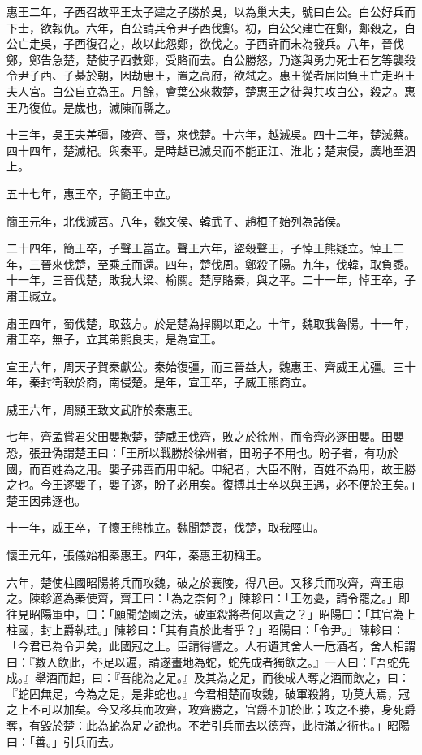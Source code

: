 \begin{pinyinscope}
惠王二年，子西召故平王太子建之子勝於吳，以為巢大夫，號曰白公。白公好兵而下士，欲報仇。六年，白公請兵令尹子西伐鄭。初，白公父建亡在鄭，鄭殺之，白公亡走吳，子西復召之，故以此怨鄭，欲伐之。子西許而未為發兵。八年，晉伐鄭，鄭告急楚，楚使子西救鄭，受賂而去。白公勝怒，乃遂與勇力死士石乞等襲殺令尹子西、子綦於朝，因劫惠王，置之高府，欲弒之。惠王從者屈固負王亡走昭王夫人宮。白公自立為王。月餘，會葉公來救楚，楚惠王之徒與共攻白公，殺之。惠王乃復位。是歲也，滅陳而縣之。

十三年，吳王夫差彊，陵齊、晉，來伐楚。十六年，越滅吳。四十二年，楚滅蔡。四十四年，楚滅杞。與秦平。是時越已滅吳而不能正江、淮北；楚東侵，廣地至泗上。

五十七年，惠王卒，子簡王中立。

簡王元年，北伐滅莒。八年，魏文侯、韓武子、趙桓子始列為諸侯。

二十四年，簡王卒，子聲王當立。聲王六年，盜殺聲王，子悼王熊疑立。悼王二年，三晉來伐楚，至乘丘而還。四年，楚伐周。鄭殺子陽。九年，伐韓，取負黍。十一年，三晉伐楚，敗我大梁、榆關。楚厚賂秦，與之平。二十一年，悼王卒，子肅王臧立。

肅王四年，蜀伐楚，取茲方。於是楚為捍關以距之。十年，魏取我魯陽。十一年，肅王卒，無子，立其弟熊良夫，是為宣王。

宣王六年，周天子賀秦獻公。秦始復彊，而三晉益大，魏惠王、齊威王尤彊。三十年，秦封衛鞅於商，南侵楚。是年，宣王卒，子威王熊商立。

威王六年，周顯王致文武胙於秦惠王。

七年，齊孟嘗君父田嬰欺楚，楚威王伐齊，敗之於徐州，而令齊必逐田嬰。田嬰恐，張丑偽謂楚王曰：「王所以戰勝於徐州者，田盼子不用也。盼子者，有功於國，而百姓為之用。嬰子弗善而用申紀。申紀者，大臣不附，百姓不為用，故王勝之也。今王逐嬰子，嬰子逐，盼子必用矣。復搏其士卒以與王遇，必不便於王矣。」楚王因弗逐也。

十一年，威王卒，子懷王熊槐立。魏聞楚喪，伐楚，取我陘山。

懷王元年，張儀始相秦惠王。四年，秦惠王初稱王。

六年，楚使柱國昭陽將兵而攻魏，破之於襄陵，得八邑。又移兵而攻齊，齊王患之。陳軫適為秦使齊，齊王曰：「為之柰何？」陳軫曰：「王勿憂，請令罷之。」即往見昭陽軍中，曰：「願聞楚國之法，破軍殺將者何以貴之？」昭陽曰：「其官為上柱國，封上爵執珪。」陳軫曰：「其有貴於此者乎？」昭陽曰：「令尹。」陳軫曰：「今君已為令尹矣，此國冠之上。臣請得譬之。人有遺其舍人一卮酒者，舍人相謂曰：『數人飲此，不足以遍，請遂畫地為蛇，蛇先成者獨飲之。』一人曰：『吾蛇先成。』舉酒而起，曰：『吾能為之足。』及其為之足，而後成人奪之酒而飲之，曰：『蛇固無足，今為之足，是非蛇也。』今君相楚而攻魏，破軍殺將，功莫大焉，冠之上不可以加矣。今又移兵而攻齊，攻齊勝之，官爵不加於此；攻之不勝，身死爵奪，有毀於楚：此為蛇為足之說也。不若引兵而去以德齊，此持滿之術也。」昭陽曰：「善。」引兵而去。


\end{pinyinscope}
